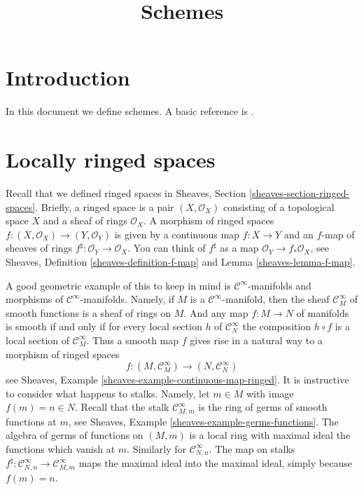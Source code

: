 

%


\title{Schemes}


\maketitle

\label{section-phantom}

\tableofcontents

\section{Introduction}
\label{section-introduction}

\noindent
In this document we define schemes.
A basic reference is \cite{EGA}.









\section{Locally ringed spaces}
\label{section-locally-ringed-spaces}

\noindent
Recall that we defined ringed spaces
in Sheaves, Section \ref{sheaves-section-ringed-spaces}.
Briefly, a ringed space is a pair $(X, \mathcal{O}_X)$ consisting
of a topological space $X$ and a sheaf of rings $\mathcal{O}_X$.
A morphism of ringed spaces $f : (X, \mathcal{O}_X) \to (Y, \mathcal{O}_Y)$
is given by a continuous map $f : X \to Y$ and an $f$-map of sheaves
of rings $f^\sharp : \mathcal{O}_Y \to \mathcal{O}_X$. You can
think of $f^\sharp$ as a map $\mathcal{O}_Y \to f_*\mathcal{O}_X$, see
Sheaves, Definition \ref{sheaves-definition-f-map} and
Lemma \ref{sheaves-lemma-f-map}.

\medskip\noindent
A good geometric example of this to keep in mind is
$\mathcal{C}^\infty$-manifolds and morphisms of
$\mathcal{C}^\infty$-manifolds. Namely, if $M$ is a
$\mathcal{C}^\infty$-manifold, then the sheaf $\mathcal{C}^\infty_M$
of smooth functions is a sheaf of rings on $M$. And any
map $f : M \to N$ of manifolds is smooth if and only if
for every local section $h$ of $\mathcal{C}^\infty_N$
the composition $h \circ f$ is a local section of $\mathcal{C}^\infty_M$.
Thus a smooth map $f$ gives rise in a natural way to a morphism
of ringed spaces
$$
f : (M , \mathcal{C}^\infty_M) \longrightarrow (N, \mathcal{C}^\infty_N)
$$
see Sheaves, Example \ref{sheaves-example-continuous-map-ringed}.
It is instructive to consider what happens to stalks. Namely, let
$m \in M$ with image $f(m) = n \in N$. Recall that the stalk
$\mathcal{C}^\infty_{M, m}$ is the ring of germs of smooth
functions at $m$, see
Sheaves, Example \ref{sheaves-example-germs-functions}.
The algebra of germs of functions on $(M, m)$ is a local ring with maximal
ideal the functions which vanish at $m$.
Similarly for $\mathcal{C}^\infty_{N, n}$. The map on stalks
$f^\sharp : \mathcal{C}^\infty_{N, n} \to \mathcal{C}^\infty_{M, m}$
maps the maximal ideal into the maximal ideal, simply
because $f(m) = n$.


